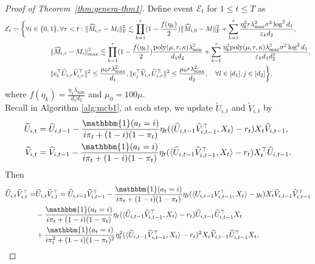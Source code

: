 \documentclass[12pt]{article}
\newcommand\fro[1]{\| #1 \|_{\rm{F}}}
\newcommand{\inp}[2]{\langle #1,#2\rangle}
\def\calE{{\mathcal E}}
\theoremstyle{plain}
\begin{document}
\begin{proof}[Proof of Theorem~\ref{thm:genera-thm1}]
    Define event $\calE_t$ for $1\leq t\leq T$ as
    \begin{align*}
        \calE_t&=\bigg\{\forall i\in\{0,1\}, \forall \tau<t: \fro{\widehat{M}_{i,\tau}-M_i}^2\lesssim \prod_{k=1}^{\tau} (1-\frac{f(\eta_k)}{2}) \fro{\widehat{M}_{i,0}-M}^2 + \sum_{k=1}^{\tau}\frac{\eta_k^2r\lambda_{\max}^2\sigma^2\log^2d_1}{\varepsilon_kd_2}, \\
        &\hspace{2cm}\|\widehat{M}_{i,\tau} - M_i\|_{\max}^2 \lesssim \prod_{k=1}^{\tau} (1-\frac{f(\eta_k)}{2}) \frac{\text{poly}(\mu,r,\kappa)\lambda_{\min}^2}{d_1d_2}+ \sum_{k=1}^{\tau} \frac{\eta_k^2\text{poly}(\mu,r,\kappa)\lambda_{\max}^2\sigma^2\log^2 d_1}{\varepsilon_k d_1d_2^2}, \\
        &\hspace{2cm} \|e_l^{\top} \widehat{U}_{i,\tau}\widehat{V}_{i,\tau}^{\top}\|^2 \leq \frac{\mu_0r\lambda_{\max}^2}{d_1}, \|e_j^{\top} \widehat{V}_{i,\tau}\widehat{U}_{i,\tau}^{\top}\|^2 \leq \frac{\mu_0r\lambda_{\max}^2}{d_2},\quad \forall l \in [d_1], j \in [d_2] \bigg\},
    \end{align*}
    where $f(\eta_k)=\frac{\eta_k\lambda_{\min}}{d_1d_2}$ and $\mu_0=100\mu$. \\
    Recall in Algorithm \ref{alg:mcb1}, at each step, we update $\widetilde{U}_{i,t}$ and $\widetilde{V}_{i,t}$ by 
    \begin{align*}
        \widetilde{U}_{i,t}&=\widehat{U}_{i,t-1}-\frac{\mathbbm{1}(a_t=i)}{i\pi_t+(1-i)(1-\pi_t)}\eta_t (\inp{\widehat{U}_{i,t-1}\widehat{V}_{i,t-1}^{\top}}{X_t}-r_t)X_t\widehat{V}_{i,t-1}, \\
        \widetilde{V}_{i,t}&=\widehat{V}_{i,t-1}-\frac{\mathbbm{1}(a_t=i)}{i\pi_t+(1-i)(1-\pi_t)}\eta_t (\inp{\widehat{U}_{i,t-1}\widehat{V}_{i,t-1}^{\top}}{X_t}-r_t)X_t^{\top}\widehat{U}_{i,t-1}.
    \end{align*}
    Then
    \begin{align*}
        \widehat{U}_{i,t}\widehat{V}_{i,t}^{\top}=&\widetilde{U}_{i,t}\widetilde{V}_{i,t}^{\top}=\widehat{U}_{i,t-1}\widehat{V}_{i,t-1}^{\top}- \frac{\mathbbm{1}(a_t=i)}{i\pi_t+(1-i)(1-\pi_t)}\eta_t(\inp{U_{i,t-1}V_{i,t-1}^{\top}}{X_t}-y_t)X_t\widehat{V}_{i,t-1}\widehat{V}_{i,t-1}^{\top} \\ &-  \frac{\mathbbm{1}(a_t=i)}{i\pi_t+(1-i)(1-\pi_t)}\eta_t(\inp{\widehat{U}_{i,t-1}\widehat{V}_{i,t-1}^{\top}}{X_t}-r_t)\widehat{U}_{i,t-1}\widehat{U}_{i,t-1}^{\top}X_t \\ &+  \frac{\mathbbm{1}(a_t=i)}{i\pi_t^2+(1-i)(1-\pi_t)^2}\eta_t^2(\inp{\widehat{U}_{i,t-1}\widehat{V}_{i,t-1}^{\top}}{X_t}-r_t)^2X_t\widehat{V}_{i,t-1}\widehat{U}_{i,t-1}^{\top}X_t.

\end{align*}
\end{proof}
\end{document}
